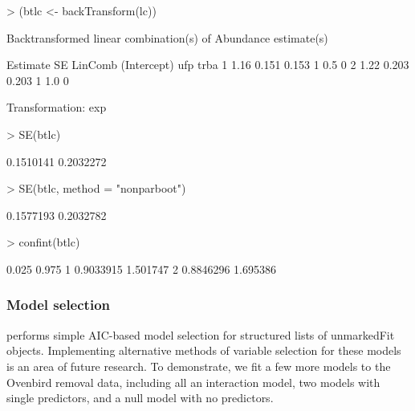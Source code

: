 \documentclass[article,shortnames]{jss}
\begin{document}
\begin{Schunk}
\begin{Sinput}
> (btlc <- backTransform(lc))
\end{Sinput}
\begin{Soutput}
Backtransformed linear combination(s) of Abundance estimate(s)

  Estimate    SE LinComb (Intercept) ufp trba
1     1.16 0.151   0.153           1 0.5    0
2     1.22 0.203   0.203           1 1.0    0

Transformation: exp 
\end{Soutput}
\begin{Sinput}
> SE(btlc)
\end{Sinput}
\begin{Soutput}
[1] 0.1510141 0.2032272
\end{Soutput}
\begin{Sinput}
> SE(btlc, method = "nonparboot")
\end{Sinput}
\begin{Soutput}
[1] 0.1577193 0.2032782
\end{Soutput}
\begin{Sinput}
> confint(btlc)
\end{Sinput}
\begin{Soutput}
      0.025    0.975
1 0.9033915 1.501747
2 0.8846296 1.695386
\end{Soutput}
\end{Schunk}



\subsubsection{Model selection}

 performs simple AIC-based model selection for
structured lists of unmarkedFit objects.  Implementing alternative
methods of variable selection for these models is an area of future
research.  To demonstrate, we fit a few more models to the Ovenbird
removal data, including all an interaction model, two models with
single predictors, and a null model with no predictors.
\end{document}
